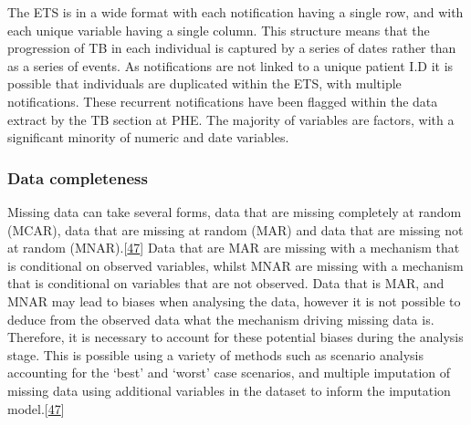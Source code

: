 \documentclass[11pt,twoside]{bristolthesis}
\begin{document}
  The ETS is in a wide format with each notification having a single row, and with each unique variable having a single column. This structure means that the progression of TB in each individual is captured by a series of dates rather than as a series of events. As notifications are not linked to a unique patient I.D it is possible that individuals are duplicated within the ETS, with multiple notifications. These recurrent notifications have been flagged within the data extract by the TB section at PHE. The majority of variables are factors, with a significant minority of numeric and date variables.
  
  \hypertarget{data-completeness}{%
  \subsubsection{Data completeness}\label{data-completeness}}
  
  Missing data can take several forms, data that are missing completely at random (MCAR), data that are missing at random (MAR) and data that are missing not at random (MNAR).{[}\protect\hyperlink{ref-Sterne2009a}{47}{]} Data that are MAR are missing with a mechanism that is conditional on observed variables, whilst MNAR are missing with a mechanism that is conditional on variables that are not observed. Data that is MAR, and MNAR may lead to biases when analysing the data, however it is not possible to deduce from the observed data what the mechanism driving missing data is. Therefore, it is necessary to account for these potential biases during the analysis stage. This is possible using a variety of methods such as scenario analysis accounting for the `best' and `worst' case scenarios, and multiple imputation of missing data using additional variables in the dataset to inform the imputation model.{[}\protect\hyperlink{ref-Sterne2009a}{47}{]}
  
\end{document}
